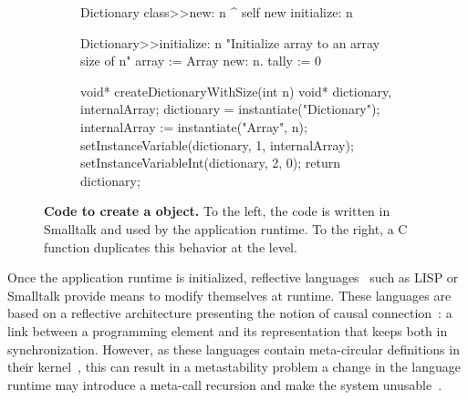 \begin{figure}[ht]
\begin{subfigure}{.5\linewidth}
\begin{code}
Dictionary class>>new: n
    ^ self new initialize: n

Dictionary>>initialize: n
    "Initialize array to an array size of n"
    array := Array new: n.
    tally := 0
\end{code}
\end{subfigure}
\begin{subfigure}{.5\linewidth}
\begin{code}
void* createDictionaryWithSize(int n){
    void* dictionary, internalArray;
    dictionary = instantiate("Dictionary");
    internalArray := instantiate("Array", n);
    setInstanceVariable(dictionary, 1, internalArray);
    setInstanceVariableInt(dictionary, 2, 0);
    return dictionary;
}
\end{code}
\end{subfigure}
\caption{\textbf{Code to create a  object.} To the left, the code is written in Smalltalk and used by the application runtime. To the right, a C function duplicates this behavior at the \VM level.\label{code:logic_dup}}
\end{figure}



Once the application runtime is initialized, reflective languages~\cite{Smit84a} such as LISP or Smalltalk provide means to modify themselves at runtime. These languages are based on a reflective architecture presenting the notion of causal connection~\cite{Maes87a}: a link between a programming element and its representation that keeps both in synchronization. However, as these languages contain meta-circular definitions in their kernel~\cite{Chib96a}, this can result in a metastability problem \ie a change in the language runtime may introduce a meta-call recursion and make the system unusable~\cite{Kicz91a}.%

